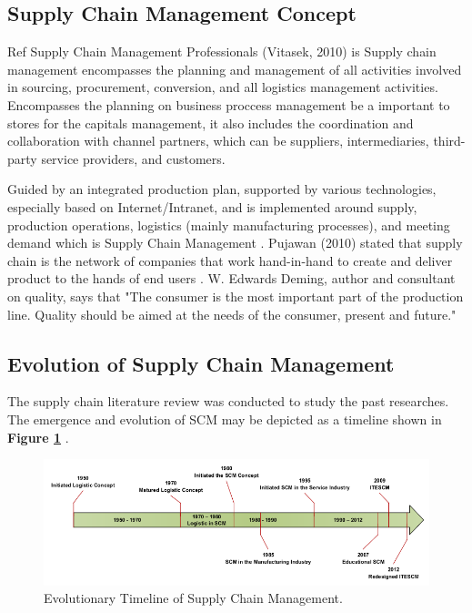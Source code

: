 \documentclass[12pt,a4paper,final]{iopart}
\begin{document}
\subsection{Supply Chain Management Concept}

Ref \cite{Liu2011a} Supply Chain Management Professionals (Vitasek, 2010) is Supply chain management encompasses the planning and management of all activities involved in sourcing, procurement, conversion, and all logistics management activities. Encompasses the planning on business proccess management be a important to stores for the capitals management, it also includes the coordination and collaboration with channel partners, which can be suppliers, intermediaries, third-party service providers, and customers.

Guided by an integrated production plan, supported by various technologies, especially based on Internet/Intranet, and is implemented around supply, production operations, logistics (mainly manufacturing processes), and meeting demand which is Supply Chain Management \cite{Li2018}. Pujawan (2010) stated that supply chain is the network of companies that work hand-in-hand to create and deliver product to the hands of end users \cite{Sampouw}. W. Edwards Deming, author and consultant on quality, says that "The consumer is the most important part of the production line. Quality should be aimed at the needs of the consumer, present and future." \cite{Rusell2011}

\subsection{Evolution of Supply Chain Management}
The supply chain literature review was conducted to study the past researches. The emergence and evolution of SCM may be depicted as a timeline shown in \textbf{Figure \ref{figureEvolution}} \cite{Habib2019}.

\begin{figure}[htb!]
	\centering
	\includegraphics[width=1.0\textwidth]
		{evolution.png}
	\caption{\label{figureEvolution}Evolutionary Timeline of Supply Chain Management.}
\end{figure}
\end{document}
